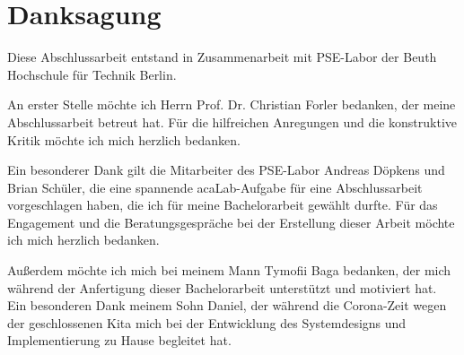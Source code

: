 \chapter*{Danksagung}
Diese Abschlussarbeit entstand in Zusammenarbeit mit PSE-Labor der Beuth Hochschule für Technik Berlin.  

An erster Stelle möchte ich Herrn Prof. Dr. Christian Forler bedanken, der meine Abschlussarbeit betreut hat. Für die hilfreichen Anregungen und die konstruktive Kritik möchte ich mich herzlich bedanken.

Ein besonderer Dank gilt die Mitarbeiter des PSE-Labor Andreas Döpkens und Brian Schüler, die eine spannende  acaLab-Aufgabe für eine Abschlussarbeit vorgeschlagen haben, die ich für meine Bachelorarbeit gewählt durfte. Für das Engagement und die Beratungsgespräche bei der Erstellung dieser Arbeit möchte ich mich herzlich bedanken.

Außerdem möchte ich mich bei meinem Mann Tymofii Baga bedanken, der mich während der Anfertigung dieser Bachelorarbeit unterstützt und motiviert hat. Ein besonderen Dank meinem Sohn Daniel, der während die Corona-Zeit wegen der geschlossenen Kita mich bei der Entwicklung des Systemdesigns und Implementierung zu Hause begleitet hat.